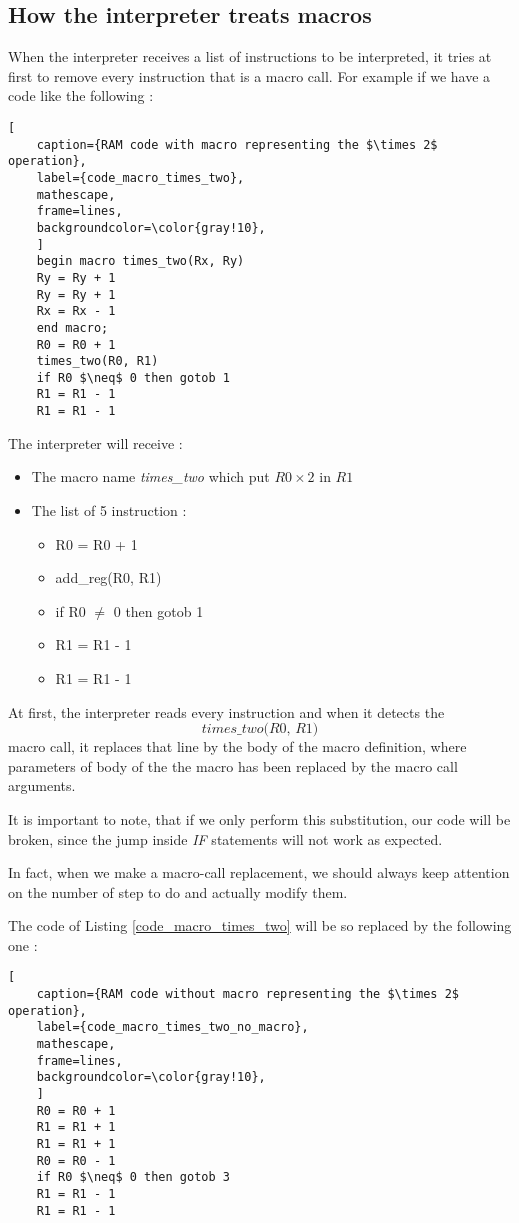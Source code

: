 \subsection{How the interpreter treats macros}
When the interpreter receives a list of instructions to be interpreted, it tries at first to remove every instruction that is a macro call. 
For example if we have a code like the following :
\begin{lstlisting}[
    caption={RAM code with macro representing the $\times 2$ operation}, 
    label={code_macro_times_two},
    mathescape, 
    frame=lines,
    backgroundcolor=\color{gray!10},
    ]
    begin macro times_two(Rx, Ry)
    Ry = Ry + 1
    Ry = Ry + 1
    Rx = Rx - 1
    end macro;
    R0 = R0 + 1
    times_two(R0, R1)
    if R0 $\neq$ 0 then gotob 1
    R1 = R1 - 1
    R1 = R1 - 1
\end{lstlisting}
\newpage
The interpreter will receive :
\begin{itemize}
    \item The macro name \textit{times\_two} which put $R0 \times 2$ in $R1$
    \item The list of 5 instruction :
    \begin{itemize}
        \item R0 = R0 + 1
        \item add\_reg(R0, R1)
        \item if R0 $\neq$ 0 then gotob 1
        \item R1 = R1 - 1
        \item R1 = R1 - 1
    \end{itemize}
\end{itemize}

At first, the interpreter reads every instruction and when it detects the 
\[\textit{times\_two(R0, R1)}\] 
macro call, it replaces that line by the body of the macro definition, where parameters of body of the the macro has been replaced by the macro call arguments.

It is important to note, that if we only perform this substitution, our code will be broken, since the jump inside \textit{IF} statements will not work as expected. 

In fact, when we make a macro-call replacement, we should always keep attention on the number of step to do and actually modify them.

The code of Listing \ref{code_macro_times_two} will be so replaced by the following one :

\begin{lstlisting}[
    caption={RAM code without macro representing the $\times 2$ operation}, 
    label={code_macro_times_two_no_macro},
    mathescape, 
    frame=lines,
    backgroundcolor=\color{gray!10},
    ]
    R0 = R0 + 1
    R1 = R1 + 1
    R1 = R1 + 1
    R0 = R0 - 1
    if R0 $\neq$ 0 then gotob 3
    R1 = R1 - 1
    R1 = R1 - 1
\end{lstlisting}

